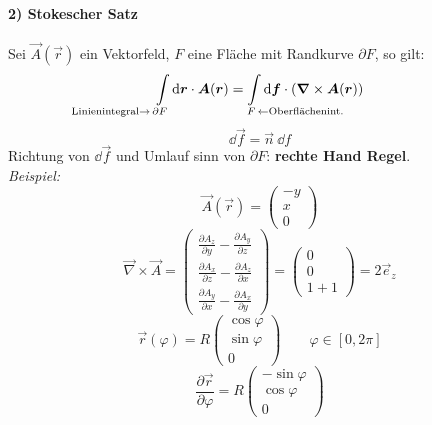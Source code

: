 \paragraph{2) Stokescher Satz}
Sei $\vec{A}(\vec{r})$ ein Vektorfeld, $F$ eine Fläche mit Randkurve $\partial F$, so gilt:
$$\int\limits_{\mathclap{\textrm{Linienintegral}\rightarrow\,\partial F \phantom{\textrm{Linienintegral}\rightarrow\,}}} \dd\vec{r} \cdot \vec{A}(\vec{r}) = \int\limits_{\mathclap{\phantom{\, \leftarrow \textrm{Oberflächenint.}} F\, \leftarrow \textrm{Oberflächenint.}}} \dd \vec{f} \cdot (\vabla \times \vec{A}(\vec{r}))$$
%
%
%
%
%
%
$$\dd\vec{f} = \vec{n} \ \dd f$$
Richtung von $\dd\vec{f}$ und Umlauf sinn von $\partial F$: \textbf{rechte Hand Regel}.\\
%
%
%
%
%
%
\emph{Beispiel:}
\begin{equation*}
\vec{A}(\vec{r}) = \begin{pmatrix}
-y \\ x \\ 0
\end{pmatrix}
\end{equation*}
%
%
%
%
%
%
\begin{equation*}
\vec{\nabla} \times \vec{A} = \begin{pmatrix}
\frac{\partial A_z}{\partial y} - \frac{\partial A_y}{\partial z} \\
\frac{\partial A_x}{\partial z} - \frac{\partial A_z}{\partial x} \\
\frac{\partial A_y}{\partial x} - \frac{\partial A_x}{\partial y}
\end{pmatrix} = \begin{pmatrix}
0 \\ 0 \\ 1 + 1
\end{pmatrix} = 2 \vec{e}_z
\end{equation*}
%
%
%
%
%
%
\begin{equation*}
\vec{r}(\varphi) = R \begin{pmatrix}
\cos \varphi \\ \sin \varphi \\ 0
\end{pmatrix} \qquad \varphi \in [0,2\pi]
\end{equation*}
\begin{equation*}
\frac{\partial \vec{r}}{\partial \varphi} = R \begin{pmatrix}
- \sin \varphi \\ \cos \varphi \\ 0
\end{pmatrix}
\end{equation*}
